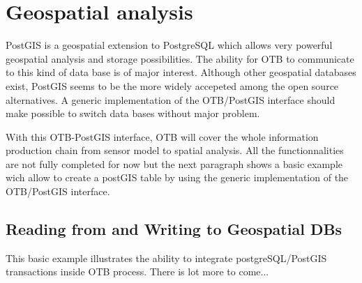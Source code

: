 
\chapter{Geospatial analysis}\label{sec:GeospatialAnalysis}

PostGIS is a geospatial extension to PostgreSQL which allows very powerful 
geospatial analysis and storage possibilities. The ability for OTB to 
communicate to this kind of data base is of major interest.
Although other geospatial databases exist, PostGIS seems to be the 
more widely accepeted among the open source alternatives. A generic 
implementation of the OTB/PostGIS interface should make possible to 
switch data bases without major problem.

With this OTB-PostGIS interface, OTB will cover the whole information 
production chain from sensor model to spatial analysis.
All the functionnalities are not fully completed for now but the next 
paragraph shows a basic example wich allow to create a postGIS table
by using the generic implementation of the OTB/PostGIS interface.
  
\section{Reading from and Writing to Geospatial DBs}\label{sec:ReadWriteGISDB}


This basic example illustrates the ability to integrate postgreSQL/PostGIS transactions
inside OTB process.
There is lot more to come...






